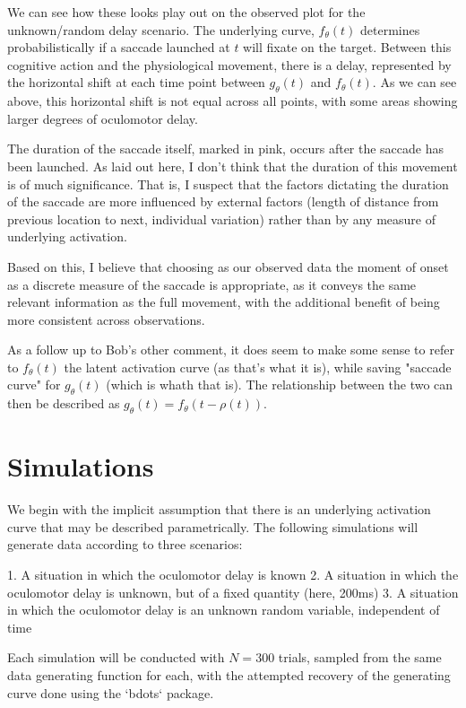 \documentclass{article}
\begin{document}
We can see how these looks play out on the observed plot for the unknown/random delay scenario. The underlying curve, $f_{\theta}(t)$ determines probabilistically if a saccade launched at $t$ will fixate on the target. Between this cognitive action and the physiological movement, there is a delay, represented by the horizontal shift at each time point between $g_{\theta}(t)$ and $f_{\theta}(t)$. As we can see above, this horizontal shift is not equal across all points, with some areas showing larger degrees of oculomotor delay.

The duration of the saccade itself, marked in pink, occurs after the saccade has been launched. As laid out here, I don't think that the duration of this movement is of much significance. That is, I suspect that the factors dictating the duration of the saccade are more influenced by external factors (length of distance from previous location to next, individual variation) rather than by any measure of underlying activation.

Based on this, I believe that choosing as our observed data the moment of onset as a discrete measure of the saccade is appropriate, as it conveys the same relevant information as the full movement, with the additional benefit of being more consistent across observations.

As a follow up to Bob's other comment, it does seem to make some sense to refer to $f_{\theta}(t)$ the latent activation curve (as that's what it is), while saving "saccade curve" for $g_{\theta}(t)$ (which is whath that is). The relationship between the two can then be described as $g_{\theta}(t) = f_{\theta}(t-\rho(t))$.


\section{Simulations}


We begin with the implicit assumption that there is an underlying activation curve that may be described parametrically. The following simulations will generate data according to three scenarios:

1. A situation in which the oculomotor delay is known
2. A situation in which the oculomotor delay is unknown, but of a fixed quantity (here, 200ms)
3. A situation in which the oculomotor delay is an unknown random variable, independent of time

Each simulation will be conducted with $N = 300$ trials, sampled from the same data generating function for each, with the attempted recovery of the generating curve done using the `bdots` package. 
\end{document}
